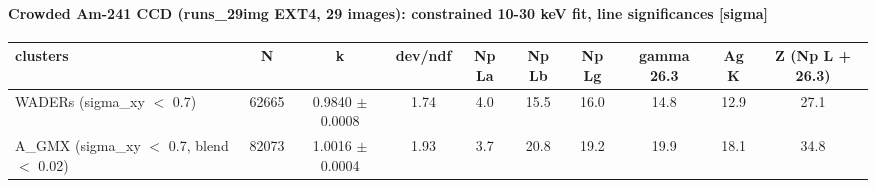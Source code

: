 \paragraph{Crowded Am-241 CCD (runs\_29img EXT4, 29 images): constrained 10-30 keV fit, line significances [sigma]}
\begin{table}[H]\centering\footnotesize
\begin{adjustbox}{max width=\linewidth}
\begin{tabular}{lccccccccc}
\toprule
clusters & N & k & dev/ndf & Np La & Np Lb & Np Lg & gamma 26.3 & Ag K & Z (Np L + 26.3) \\
\midrule
WADERs (sigma\_xy $<$ 0.7) & 62665 & 0.9840 $\pm$ 0.0008 & 1.74 & 4.0 & 15.5 & 16.0 & 14.8 & 12.9 & 27.1 \\
A\_GMX (sigma\_xy $<$ 0.7, blend $<$ 0.02) & 82073 & 1.0016 $\pm$ 0.0004 & 1.93 & 3.7 & 20.8 & 19.2 & 19.9 & 18.1 & 34.8 \\
\bottomrule
\end{tabular}
\end{adjustbox}
\end{table}
